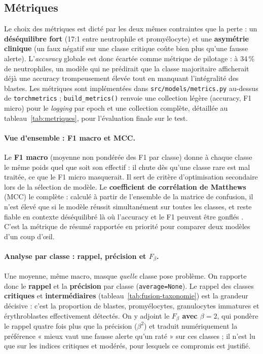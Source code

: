 \subsection{Métriques}
\label{sub:metriques}

Le choix des métriques est dicté par les deux mêmes contraintes que la perte : un \textbf{déséquilibre fort} (17:1 entre neutrophile et promyélocyte) et une \textbf{asymétrie clinique} (un faux négatif sur une classe critique coûte bien plus qu'une fausse alerte).
L'\emph{accuracy} globale est donc écartée comme métrique de pilotage : à 34\,\% de neutrophiles, un modèle qui ne prédirait que la classe majoritaire afficherait déjà une accuracy trompeusement élevée tout en manquant l'intégralité des blastes.
Les métriques sont implémentées dans \texttt{src/models/metrics.py} au-dessus de \texttt{torchmetrics} ; \texttt{build\_metrics()} renvoie une collection légère (accuracy, F1 micro) pour le \emph{logging} par epoch et une collection complète, détaillée au tableau~\ref{tab:metriques}, pour l'évaluation finale sur le test.

\paragraph{Vue d'ensemble : F1 macro et MCC.} Le \textbf{F1 macro} (moyenne non pondérée des F1 par classe) donne à chaque classe le même poids quel que soit son effectif : il chute dès qu'une classe rare est mal traitée, ce que le F1 micro masquerait.
Il sert de critère d'optimisation secondaire lors de la sélection de modèle.
Le \textbf{coefficient de corrélation de Matthews} (MCC) le complète : calculé à partir de l'ensemble de la matrice de confusion, il n'est élevé que si le modèle réussit simultanément sur toutes les classes, et reste fiable en contexte déséquilibré là où l'accuracy et le F1 peuvent être gonflés \parencite{chicco2020mcc,grandini2020metrics}.
C'est la métrique de résumé rapportée en priorité pour comparer deux modèles d'un coup d'\oe{}il.

\paragraph{Analyse par classe : rappel, précision et $F_\beta$.} Une moyenne, même macro, masque \emph{quelle} classe pose problème.
On rapporte donc le \textbf{rappel} et la \textbf{précision} par classe (\texttt{average=None}).
Le rappel des classes \textbf{critiques} et \textbf{intermédiaires} (tableau~\ref{tab:fusion-taxonomie}) est la grandeur décisive : c'est la proportion de blastes, promyélocytes, granulocytes immatures et érythroblastes effectivement détectés.
On y adjoint le \textbf{$F_\beta$ avec $\beta = 2$}, qui pondère le rappel quatre fois plus que la précision ($\beta^2$) et traduit numériquement la préférence « mieux vaut une fausse alerte qu'un raté » sur ces classes ; il n'est lu que sur les indices critiques et modérés, pour lesquels ce compromis est justifié.

